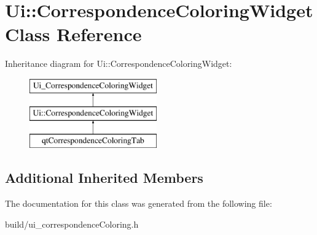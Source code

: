 \hypertarget{class_ui_1_1_correspondence_coloring_widget}{}\section{Ui\+:\+:Correspondence\+Coloring\+Widget Class Reference}
\label{class_ui_1_1_correspondence_coloring_widget}
Inheritance diagram for Ui\+:\+:Correspondence\+Coloring\+Widget\+:\begin{figure}[H]
\begin{center}
\leavevmode
\includegraphics[height=3.000000cm]{class_ui_1_1_correspondence_coloring_widget}
\end{center}
\end{figure}
\subsection*{Additional Inherited Members}


The documentation for this class was generated from the following file\+:\begin{DoxyCompactItemize}
\item 
build/ui\+\_\+correspondence\+Coloring.\+h\end{DoxyCompactItemize}
